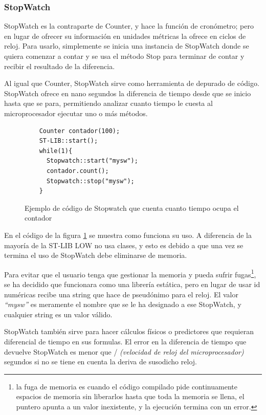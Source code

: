 \documentclass{report}
\begin{document}
\subsubsection{StopWatch}
StopWatch es la contraparte de Counter, y hace la función de cronómetro; pero en lugar de ofrecer su información en unidades métricas la ofrece en ciclos de reloj. Para usarlo, simplemente se inicia una instancia de StopWatch donde se quiera comenzar a contar y se usa el método Stop para terminar de contar y recibir el resultado de la diferencia. 
\par \vspace{0.3cm}
Al igual que Counter, StopWatch sirve como herramienta de depurado de código. StopWatch ofrece en nano segundos la diferencia de tiempo desde que se inicio hasta que se para, permitiendo analizar cuanto tiempo le cuesta al microprocesador ejecutar uno o más métodos. 
\begin{figure}[h]
  \begin{lstlisting}
    Counter contador(100);
    ST-LIB::start();
    while(1){
      Stopwatch::start("mysw");
      contador.count();
      Stopwatch::stop("mysw");
    }
  \end{lstlisting}
  \caption{Ejemplo de código de Stopwatch que cuenta cuanto tiempo ocupa el contador}
  \label{StopWatchCode}
\end{figure}
\par \vspace{0.3cm}
En el código de la figura \ref{StopWatchCode} se muestra como funciona su uso. A diferencia de la mayoría de la ST-LIB LOW no usa clases, y esto es debido a que una vez se termina el uso de StopWatch debe eliminarse de memoria. \par 
Para evitar que el usuario tenga que gestionar la memoria y pueda sufrir fugas\footnote{la fuga de memoria es cuando el código compilado pide continuamente espacios de memoria sin liberarlos hasta que toda la memoria se llena, el puntero apunta a un valor inexistente, y la ejecución termina con un error.}, se ha decidido que funcionara como una librería estática, pero en lugar de usar id numéricas recibe una string que hace de pseudónimo para el reloj. El valor \textit{``mysw''} es meramente el nombre que se le ha designado a ese StopWatch, y cualquier string es un valor válido.
\par \vspace{0.3cm}
StopWatch también sirve para hacer cálculos físicos o predictores que requieran diferencial de tiempo en sus formulas. El error en la diferencia de tiempo que devuelve StopWatch es menor que  / \textit{(velocidad de reloj del microprocesador)} segundos si no se tiene en cuenta la deriva de susodicho reloj.  
\end{document}
